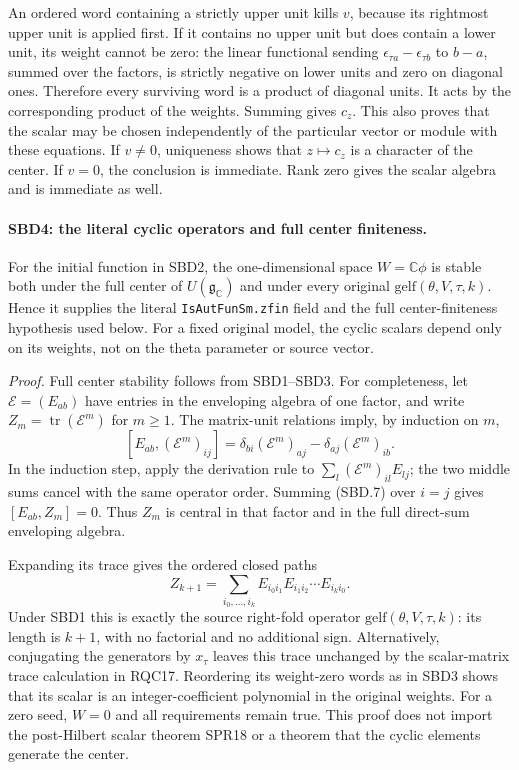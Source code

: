 An ordered word containing a strictly upper unit kills \(v\),
because its rightmost upper unit is applied first.  If it contains
no upper unit but does contain a lower unit, its weight cannot be
zero: the linear functional sending
\(\epsilon_{\tau a}-\epsilon_{\tau b}\) to \(b-a\), summed over
the factors, is strictly negative on lower units and zero on
diagonal ones.  Therefore every surviving word is a product of
diagonal units.  It acts by the corresponding product of the
weights.  Summing gives \(c_z\).  This also proves that the scalar
may be chosen independently of the particular vector or module
with these equations.  If \(v\ne0\), uniqueness shows that
\(z\mapsto c_z\) is a character of the center.  If \(v=0\), the
conclusion is immediate.  Rank zero gives the scalar algebra and
is immediate as well.

\paragraph{SBD4: the literal cyclic operators and full center finiteness.}
\label{claim:SBD4}
For the initial function in SBD2, the one-dimensional space
\(W=\mathbb C\phi\) is stable both under the full center of
\(U(\mathfrak g_{\mathbb C})\) and under every original
\(\mathrm{gelf}(\theta,V,\tau,k)\).  Hence it supplies the literal
\texttt{Is\allowbreak Aut\allowbreak Fun\allowbreak Sm.\allowbreak zfin} field and the full center-finiteness
hypothesis used below.  For a fixed original model, the cyclic
scalars depend only on its weights, not on the theta parameter or
source vector.

\emph{Proof.}
Full center stability follows from SBD1--SBD3.  For completeness,
let \(\mathcal E=(E_{ab})\) have entries in the enveloping algebra
of one factor, and write \(Z_m=\operatorname{tr}(\mathcal E^m)\)
for \(m\ge1\).  The matrix-unit relations imply, by induction on
\(m\),
\[
 [E_{ab},(\mathcal E^m)_{ij}]
   =\delta_{bi}(\mathcal E^m)_{aj}
      -\delta_{aj}(\mathcal E^m)_{ib}.
 \tag{SBD.7}
\]
In the induction step, apply the derivation rule to
\(\sum_l(\mathcal E^m)_{il}E_{lj}\); the two middle sums cancel
with the same operator order.  Summing (SBD.7) over \(i=j\)
gives \([E_{ab},Z_m]=0\).  Thus \(Z_m\) is central in that
factor and in the full direct-sum enveloping algebra.

Expanding its trace gives the ordered closed paths
\[
 Z_{k+1}=\sum_{i_0,\ldots,i_k}
 E_{i_0i_1}E_{i_1i_2}\cdots E_{i_ki_0}.
 \tag{SBD.8}
\]
Under SBD1 this is exactly the source right-fold operator
\(\mathrm{gelf}(\theta,V,\tau,k)\): its length is \(k+1\), with
no factorial and no additional sign.  Alternatively, conjugating
the generators by \(x_\tau\) leaves this trace unchanged by the
scalar-matrix trace calculation in RQC17.  Reordering its
weight-zero words as in SBD3 shows that its scalar is an
integer-coefficient polynomial in the original weights.  For a
zero seed, \(W=0\) and all requirements remain true.  This proof
does not import the post-Hilbert scalar theorem SPR18 or a theorem
that the cyclic elements generate the center.

